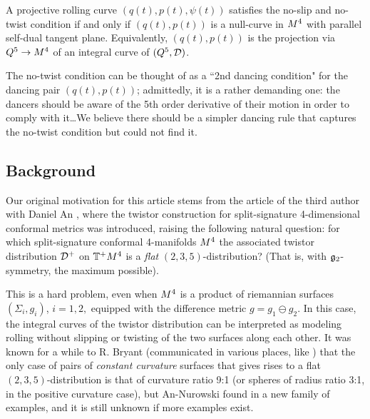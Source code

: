 \begin{theorem}
A projective rolling curve $(q(t),p(t),\psi(t))$ satisfies the no-slip and no-twist condition if and only if  $(q(t),p(t))$ is a null-curve in $M^4$ with parallel self-dual tangent plane. Equivalently, $(q(t),p(t))$ is the projection via $Q^5\to M^4$ of an integral curve of $(Q^5,{\mathcal D})$. 
\end{theorem}

The no-twist condition can be thought of as a  ``2nd dancing condition" for the dancing pair $(q(t),p(t))$; admittedly, it is a rather demanding  one: the dancers should be aware of the 5th order derivative of their motion in order to comply with  it\dots We believe there should be a simpler dancing rule that captures the no-twist condition but could not find it. 


 






  \subsection{Background}
 Our original motivation for this article stems from  the article of the third author  with Daniel An
 \cite{AN}, where the twistor construction for split-signature 4-dimensional conformal metrics was introduced, raising  the following natural question: for which split-signature conformal 4-manifolds  $M^4$ the associated twistor distribution ${\mathcal D}^+$ on $\mathbb{T}^+M^4$ is a {\em flat}  $(2,3,5)$-distribution? (That is, with  ${\mathfrak{g}}_2$-symmetry, the maximum possible). 

This is a hard problem, even when $M^4$ is a product of riemannian surfaces $(\Sigma_i, g_i)$, $i=1,2,$  equipped with the difference metric   $g=g_1\ominus g_2.$
 In this case, the integral curves of the twistor distribution  can be interpreted as modeling rolling without slipping or twisting of the two surfaces along each other. It was known for a while to  R. Bryant (communicated in various places, like \cite{BM,Zel}) that the only case of pairs of {\em constant curvature}   surfaces that gives rises  to a flat $(2,3,5)$-distribution is that of curvature ratio 9:1 (or spheres of radius ratio 3:1, in the positive curvature case), but An-Nurowski found  in \cite{AN} a   new family of  examples, and it is still unknown if more examples exist. 

